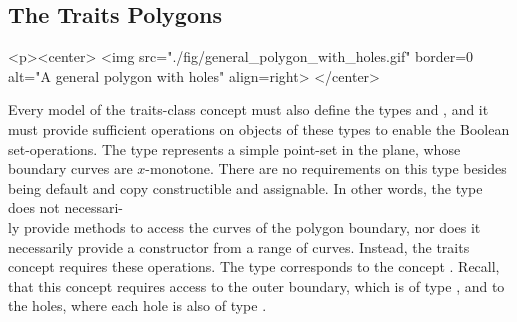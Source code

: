 \subsection{The Traits Polygons}
\label{bso_ssec:traits_polygons}
\lcTex{%
  \setlength{\widthRight}{1.4cm}
  \setlength{\widthLeft}{\widthLineReal}
  \addtolength{\widthLeft}{-\widthRight}
  \begin{minipage}{\widthLeft}
}
\label{fig:general_polygon_with_holes}
\begin{ccHtmlOnly}
  <p><center>
    <img src="./fig/general_polygon_with_holes.gif" border=0 alt="A general polygon with holes" align=right>
  </center>
\end{ccHtmlOnly}
Every model of the traits-class concept must also define the types
 and , and it must provide
sufficient operations on objects of these types to enable the Boolean 
set-operations.  The type  represents a simple point-set 
in the plane, whose boundary curves are $x$-monotone. There are no 
requirements on this type besides being default and copy constructible and
assignable. In other words, the type  does not necessari-
\\
ly provide methods to access the curves of the polygon boundary, nor 
does it necessarily provide a constructor from a range of curves. Instead, 
the traits concept requires these operations. The type 
 corresponds to the concept 
. Recall, that this concept 
requires access to the outer boundary, which is of type , 
and to the holes, where each hole is also of type .

